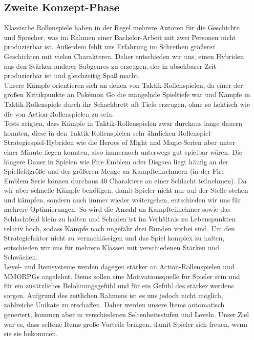 \documentclass[extern,palatino]{cgBA}
\begin{document}
\subsection{Zweite Konzept-Phase}
Klassische Rollenspiele haben in der Regel mehrere Autoren für die Geschichte und Sprecher, was im Rahmen einer Bachelor-Arbeit mit zwei Personen nicht produzierbar ist. Außerdem fehlt uns Erfahrung im Schreiben größerer Geschichten mit vielen Charakteren. Daher entschieden wir uns, einen Hybriden aus den Stärken anderer Subgenres zu erzeugen, der in absehbarer Zeit produzierbar ist und gleichzeitig Spaß macht. 
\\Unsere Kämpfe orientieren sich an denen von Taktik-Rollenspielen, da einer der großen Kritikpunkte an Pokémon Go die mangelnde Spieltiefe war und Kämpfe in Taktik-Rollenspiele durch ihr Schachbrett oft Tiefe erzeugen, ohne so hektisch wie die von Action-Rollenspielen zu sein. \\Tests zeigten, dass Kämpfe in Taktik-Rollenspielen zwar durchaus lange dauern konnten, diese in den Taktik-Rollenspielen sehr ähnlichen Rollenspiel-Strategiespiel-Hybriden wie die Heroes of Might and Magic-Serien aber unter einer Minute liegen konnten, also immernoch unterwegs gut spielbar wären. Die längere Dauer in Spielen wie Fire Emblem oder Disgaea liegt häufig an der Spielfeldgröße und der größeren Menge an Kampfteilnehmern (in der Fire Emblem Serie können durchaus 40 Charaktere an einer Schlacht teilnehmen). Da wir aber schnelle Kämpfe benötigen, damit Spieler nicht nur auf der Stelle stehen und kämpfen,  sondern auch immer wieder weitergehen, entschieden wir uns für mehrere Optimierungen. So wird die Anzahl an Kampfteilnehmer sowie das Schlachtfeld klein zu halten und Schaden ist im Verhältnis zu Lebenspunkten relativ hoch, sodass Kämpfe nach ungefähr drei Runden vorbei sind. Um den Strategiefaktor nicht zu vernachlässigen und das Spiel komplex zu halten, entschieden wir uns für mehrere Klassen mit verschiedenen Stärken und Schwächen.
\\Level- und Itemsysteme werden dagegen stärker an Action-Rollenspielen und MMORPGs angelehnt. Items sollen eine Motivationsquelle für Spieler sein und für ein zusätzliches Belohnungsgefühl und für ein Gefühl des stärker werdens sorgen.%
 Aufgrund des zeitlichen Rahmens ist es uns jedoch nicht möglich, zahlreiche Unikate zu erschaffen. Daher werden unsere Items automatisch generiert, kommen aber in verschiedenen Seltenheitsstufen und Leveln. Unser Ziel war es, dass seltene Items große Vorteile bringen, damit Spieler sich freuen, wenn sie sie bekommen.
\end{document}
